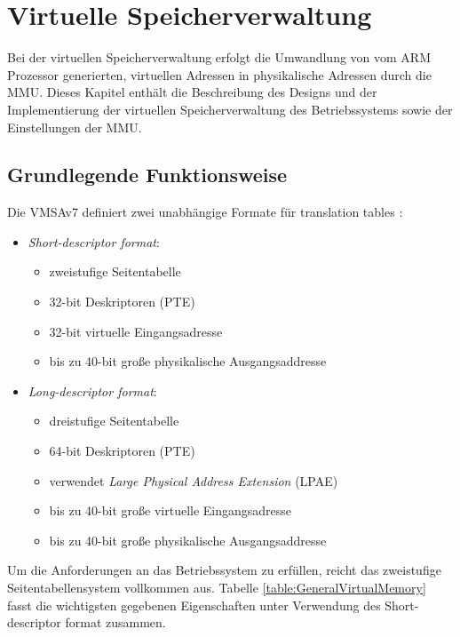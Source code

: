 \section{Virtuelle Speicherverwaltung}

Bei der virtuellen Speicherverwaltung erfolgt die Umwandlung von vom ARM Prozessor generierten, virtuellen Adressen in physikalische Adressen durch die \ac{MMU}. Dieses Kapitel enthält die Beschreibung des Designs und der Implementierung der virtuellen Speicherverwaltung des Betriebssystems sowie der Einstellungen der MMU.\\

\subsection{Grundlegende Funktionsweise}

Die \ac{VMSAv7} definiert zwei unabhängige Formate für translation tables \cite[S. B3-1318]{ARM:ARM}:

\begin{itemize}
	\item \emph{Short-descriptor format}:
	\begin{itemize}
		\item zweistufige Seitentabelle 
		\item 32-bit Deskriptoren (PTE)
		\item 32-bit virtuelle Eingangsadresse 
		\item bis zu 40-bit große physikalische Ausgangsaddresse
	\end{itemize}
	\item \emph{Long-descriptor format}:
	\begin{itemize}
		\item dreistufige Seitentabelle
		\item 64-bit Deskriptoren (\acs{PTE})
		\item verwendet \emph{Large Physical Address Extension} (LPAE)
		\item bis zu 40-bit große virtuelle Eingangsadresse 
		\item bis zu 40-bit große physikalische Ausgangsaddresse
	\end{itemize}
\end{itemize}

Um die Anforderungen an das Betriebssystem zu erfüllen, reicht das zweistufige Seitentabellensystem vollkommen aus. Tabelle \ref{table:GeneralVirtualMemory} fasst die wichtigsten gegebenen Eigenschaften unter Verwendung des Short-descriptor format zusammen.\\

